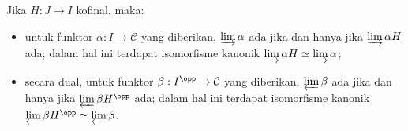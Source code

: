 \begin{proposisi}\label{prop:cofinal-lim}
	Jika $H: J \to I$ kofinal, maka:
	\begin{itemize}
		\item untuk funktor $\alpha: I \to \mathcal{C}$ yang diberikan,
		$\varinjlim \alpha$ ada jika dan hanya jika $\varinjlim \alpha H$ ada;
		dalam hal ini terdapat isomorfisme kanonik
		$\varinjlim \alpha H \simeq \varinjlim \alpha$;
		\item secara dual, untuk funktor
		$\beta: I^{\opp} \to \mathcal{C}$ yang diberikan,
		$\varprojlim \beta$ ada jika dan hanya jika
		$\varprojlim \beta H^{\opp}$ ada; dalam hal ini terdapat isomorfisme
		kanonik $\varprojlim \beta H^{\opp} \simeq \varprojlim \beta$.
	\end{itemize}
\end{proposisi}
